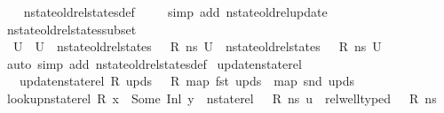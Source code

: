 \begin{isabellebody}
%
\isadelimproof
\ \ %
\endisadelimproof
%
\isatagproof
{}\isamarkupfalse%
\ nstate{\isacharunderscore}{\kern0pt}old{\isacharunderscore}{\kern0pt}rel{\isacharunderscore}{\kern0pt}states{\isacharunderscore}{\kern0pt}def\ \isanewline
\ \ \isamarkupfalse%
\ {\isacharparenleft}{\kern0pt}simp\ add{\isacharcolon}{\kern0pt}\ nstate{\isacharunderscore}{\kern0pt}old{\isacharunderscore}{\kern0pt}rel{\isacharunderscore}{\kern0pt}update{\isacharparenright}{\kern0pt}%
\endisatagproof
{\isafoldproof}%
%
\isadelimproof
\isanewline
%
\endisadelimproof
\isanewline
{}\isamarkupfalse%
\ nstate{\isacharunderscore}{\kern0pt}old{\isacharunderscore}{\kern0pt}rel{\isacharunderscore}{\kern0pt}states{\isacharunderscore}{\kern0pt}subset{\isacharcolon}{\kern0pt}\ \isanewline
\ \ {\isachardoublequoteopen}U{\isacharprime}{\kern0pt}\ {\isasymsubseteq}\ U\ {\isasymLongrightarrow}\ nstate{\isacharunderscore}{\kern0pt}old{\isacharunderscore}{\kern0pt}rel{\isacharunderscore}{\kern0pt}states\ {\isasymLambda}\ {\isasymLambda}{\isacharprime}{\kern0pt}\ R\ ns{}\ U\ {\isasymLongrightarrow}\ nstate{\isacharunderscore}{\kern0pt}old{\isacharunderscore}{\kern0pt}rel{\isacharunderscore}{\kern0pt}states\ {\isasymLambda}\ {\isasymLambda}{\isacharprime}{\kern0pt}\ R\ ns{}\ U{\isacharprime}{\kern0pt}{\isachardoublequoteclose}\isanewline
%
\isadelimproof
\ \ %
\endisadelimproof
%
\isatagproof
{}\isamarkupfalse%
\ {\isacharparenleft}{\kern0pt}auto\ simp\ add{\isacharcolon}{\kern0pt}\ nstate{\isacharunderscore}{\kern0pt}old{\isacharunderscore}{\kern0pt}rel{\isacharunderscore}{\kern0pt}states{\isacharunderscore}{\kern0pt}def{\isacharparenright}{\kern0pt}%
\endisatagproof
{\isafoldproof}%
%
\isadelimproof
\isanewline
%
\endisadelimproof
\isanewline
{}\isamarkupfalse%
\ update{\isacharunderscore}{\kern0pt}nstate{\isacharunderscore}{\kern0pt}rel\isanewline
\ \ \ {\isachardoublequoteopen}update{\isacharunderscore}{\kern0pt}nstate{\isacharunderscore}{\kern0pt}rel\ R\ upds\ \ {\isacharequal}{\kern0pt}\ R\ {\isacharparenleft}{\kern0pt}{\isacharparenleft}{\kern0pt}map\ fst\ upds{\isacharparenright}{\kern0pt}\ {\isacharbrackleft}{\kern0pt}{\isasymmapsto}{\isacharbrackright}{\kern0pt}\ {\isacharparenleft}{\kern0pt}map\ snd\ upds{\isacharparenright}{\kern0pt}{\isacharparenright}{\kern0pt}{\isachardoublequoteclose}\isanewline
\isanewline
{}\isamarkupfalse%
\ lookup{\isacharunderscore}{\kern0pt}nstate{\isacharunderscore}{\kern0pt}rel{\isacharcolon}{\kern0pt}\ {\isachardoublequoteopen}R\ x\ {\isacharequal}{\kern0pt}\ Some\ {\isacharparenleft}{\kern0pt}Inl\ y{\isacharparenright}{\kern0pt}\ {\isasymLongrightarrow}\ nstate{\isacharunderscore}{\kern0pt}rel\ {\isasymLambda}\ {\isasymLambda}{\isacharprime}{\kern0pt}\ R\ ns\ u\ {\isasymLongrightarrow}\ rel{\isacharunderscore}{\kern0pt}well{\isacharunderscore}{\kern0pt}typed\ {\isasymLambda}\ {\isasymOmega}\ R\ ns\ {\isasymLongrightarrow}\isanewline

\end{isabellebody}
